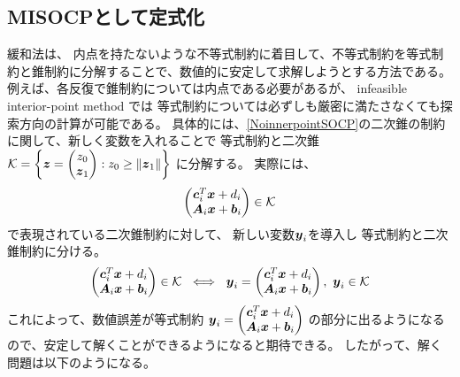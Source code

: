 \documentclass[11pt,a4paper,dvipdfmx,titlepage,uplatex]{jsarticle}
\theoremstyle{mystyle}
\newcommand{\0}{\mathbf{0}}
\def\b{\mbox{\boldmath $b$}}
\def\c{\mbox{\boldmath $c$}}
\def\x{\mbox{\boldmath $x$}}
\def\y{\mbox{\boldmath $y$}}
\def\z{\mbox{\boldmath $z$}}
\def\A{\mbox{\boldmath $A$}}
\def\KC{\mbox{$\cal K$}}
\begin{document}
\subsection{MISOCPとして定式化}\label{sec:Deformation_relax}
緩和法は、
内点を持たないような不等式制約に着目して、不等式制約を等式制約と錐制約に分解することで、数値的に安定して求解しようとする方法である。
例えば、各反復で錐制約については内点である必要があるが、
infeasible interior-point method では
等式制約については必ずしも厳密に満たさなくても探索方向の計算が可能である。
具体的には、\eqref{NoinnerpointSOCP}の二次錐の制約に関して、新しく変数を入れることで
等式制約と二次錐 $\KC = \left\{ \z = \begin{pmatrix}
z_0 \\ \z_1  \end{pmatrix}: z_0 \ge \|\z_1\| \right\}$ に分解する。
実際には、
\begin{align}
  \begin{pmatrix}
  \c_i^T \x + d_i \\  \A_i \x + \b_i
\end{pmatrix} \in \KC
\end{align}
で表現されている二次錐制約に対して、
新しい変数$\y_i$を導入し
等式制約と二次錐制約に分ける。
\begin{align}
	\begin{pmatrix}
		\c_i^T \x + d_i \\  \A_i \x + \b_i
	\end{pmatrix} \in \KC
\ \iff \
  \y_i = \begin{pmatrix}
  \c_i^T \x + d_i \\  \A_i \x + \b_i
\end{pmatrix}, \ \y_i \in \KC
\end{align}
これによって、数値誤差が等式制約
$\y_i = \begin{pmatrix}
\c_i^T \x + d_i \\  \A_i \x + \b_i
\end{pmatrix}$
の部分に出るようになるので、安定して解くことができるようになると期待できる。
したがって、解く問題は以下のようになる。
\end{document}
